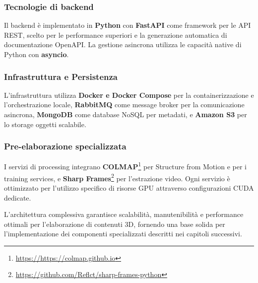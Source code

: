 \subsubsection{Tecnologie di backend}

Il backend è implementato in \textbf{Python} con \textbf{FastAPI} come framework per le API REST, scelto per le performance superiori e la generazione automatica di documentazione OpenAPI. La gestione asincrona utilizza le capacità native di Python con \textbf{asyncio}.

\subsubsection{Infrastruttura e Persistenza}

L'infrastruttura utilizza \textbf{Docker e Docker Compose} per la containerizzazione e l'orchestrazione locale, \textbf{RabbitMQ} come message broker per la comunicazione asincrona, \textbf{MongoDB} come database NoSQL per metadati, e \textbf{Amazon S3} per lo storage oggetti scalabile.

\subsubsection{Pre-elaborazione specializzata}

I servizi di processing integrano \textbf{COLMAP}\footnote{\url{https://https://colmap.github.io}} per Structure from Motion e per i training services, e \textbf{Sharp Frames}\footnote{\url{https://github.com/Reflct/sharp-frames-python}} per l'estrazione video. Ogni servizio è ottimizzato per l'utilizzo specifico di risorse GPU attraverso configurazioni CUDA dedicate.

L'architettura complessiva garantisce scalabilità, manutenibilità e performance ottimali per l'elaborazione di contenuti 3D, fornendo una base solida per l'implementazione dei componenti specializzati descritti nei capitoli successivi.


